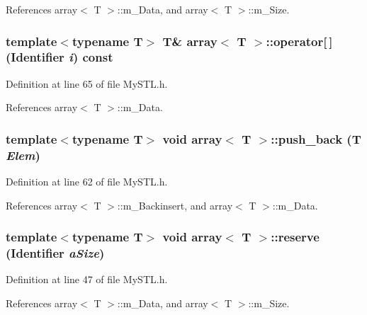 References array$<$ T $>$::m\_\-Data, and array$<$ T $>$::m\_\-Size.

\subsubsection[{operator[]}]{\setlength{\rightskip}{0pt plus 5cm}template$<$typename T$>$ T\& {\bf array}$<$ T $>$::operator\mbox{[}$\,$\mbox{]} ({\bf Identifier} {\em i}) const}\label{classarray_a03d4de353f226903e19a4cb03a0de10e}


Definition at line 65 of file MySTL.h.



References array$<$ T $>$::m\_\-Data.

\subsubsection[{push\_\-back}]{\setlength{\rightskip}{0pt plus 5cm}template$<$typename T$>$ void {\bf array}$<$ T $>$::push\_\-back (T {\em Elem})}\label{classarray_a914bed3e4fa578bbd5f4cb0968190dba}


Definition at line 62 of file MySTL.h.



References array$<$ T $>$::m\_\-Backinsert, and array$<$ T $>$::m\_\-Data.

\subsubsection[{reserve}]{\setlength{\rightskip}{0pt plus 5cm}template$<$typename T$>$ void {\bf array}$<$ T $>$::reserve ({\bf Identifier} {\em aSize})}\label{classarray_a78ed6d2bf5c7ef2dc5683464f3f7c49e}


Definition at line 47 of file MySTL.h.



References array$<$ T $>$::m\_\-Data, and array$<$ T $>$::m\_\-Size.

